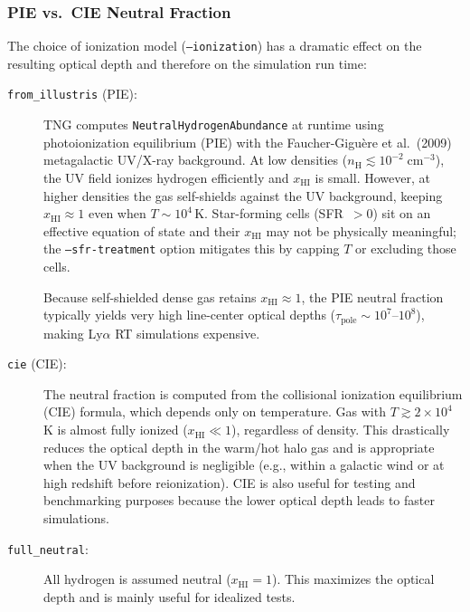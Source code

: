 \documentclass[english,a4paper]{my_memo}
\begin{document}
\subsubsection{PIE vs.\ CIE Neutral Fraction}
\label{sec:pie_vs_cie}

The choice of ionization model (\texttt{--ionization}) has a dramatic
effect on the resulting optical depth and therefore on the simulation
run time:

\begin{description}
\item[\texttt{from\_illustris} (PIE):] TNG computes
  \texttt{NeutralHydrogenAbundance} at runtime using
  photoionization equilibrium (PIE) with the Faucher-Gigu\`{e}re et
  al.\ (2009) metagalactic UV/X-ray background.  At low densities
  ($n_\mathrm{H} \lesssim 10^{-2}\;\mathrm{cm^{-3}}$), the UV field
  ionizes hydrogen efficiently and $x_\mathrm{HI}$ is small.  However,
  at higher densities the gas self-shields against the UV background,
  keeping $x_\mathrm{HI} \approx 1$ even when $T \sim 10^4$\,K.
  Star-forming cells (SFR~$> 0$) sit on an effective equation of state
  and their $x_\mathrm{HI}$ may not be physically meaningful;
  the \texttt{--sfr-treatment} option mitigates this by capping $T$
  or excluding those cells.

  Because self-shielded dense gas retains $x_\mathrm{HI} \approx 1$,
  the PIE neutral fraction typically yields very high line-center optical
  depths ($\tau_\mathrm{pole} \sim 10^{7}$--$10^{8}$), making
  Ly$\alpha$ RT simulations expensive.

\item[\texttt{cie} (CIE):] The neutral fraction is computed from the
  collisional ionization equilibrium (CIE) formula, which depends only
  on temperature.  Gas with $T \gtrsim 2\times10^4$\,K is almost
  fully ionized ($x_\mathrm{HI} \ll 1$), regardless of density.
  This drastically reduces the optical depth in the warm/hot halo gas
  and is appropriate when the UV background is negligible (e.g., within
  a galactic wind or at high redshift before reionization).
  CIE is also useful for testing and benchmarking purposes because the
  lower optical depth leads to faster simulations.

\item[\texttt{full\_neutral}:] All hydrogen is assumed neutral
  ($x_\mathrm{HI} = 1$).  This maximizes the optical depth and is
  mainly useful for idealized tests.
\end{description}
\end{document}
